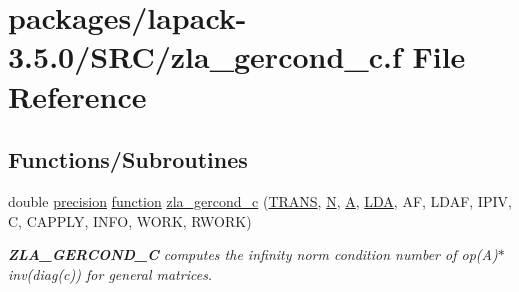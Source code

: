 \hypertarget{zla__gercond__c_8f}{}\section{packages/lapack-\/3.5.0/\+S\+R\+C/zla\+\_\+gercond\+\_\+c.f File Reference}
\label{zla__gercond__c_8f}
\subsection*{Functions/\+Subroutines}
\begin{DoxyCompactItemize}
\item 
double \hyperlink{numinquire_8h_a2c8e616467665d0b2814d4c1589ba74e}{precision} \hyperlink{afunc_8m_a7b5e596df91eadea6c537c0825e894a7}{function} \hyperlink{group__complex16GEcomputational_gab08ab71400afba05aff8565ab8d3d4e0}{zla\+\_\+gercond\+\_\+c} (\hyperlink{superlu__enum__consts_8h_a0c4e17b2d5cea33f9991ccc6a6678d62a1f61e3015bfe0f0c2c3fda4c5a0cdf58}{T\+R\+A\+N\+S}, \hyperlink{polmisc_8c_a0240ac851181b84ac374872dc5434ee4}{N}, \hyperlink{classA}{A}, \hyperlink{example__user_8c_ae946da542ce0db94dced19b2ecefd1aa}{L\+D\+A}, A\+F, L\+D\+A\+F, I\+P\+I\+V, C, C\+A\+P\+P\+L\+Y, I\+N\+F\+O, W\+O\+R\+K, R\+W\+O\+R\+K)
\begin{DoxyCompactList}\small\item\em {\bfseries Z\+L\+A\+\_\+\+G\+E\+R\+C\+O\+N\+D\+\_\+\+C} computes the infinity norm condition number of op(\+A)$\ast$inv(diag(c)) for general matrices. \end{DoxyCompactList}\end{DoxyCompactItemize}
